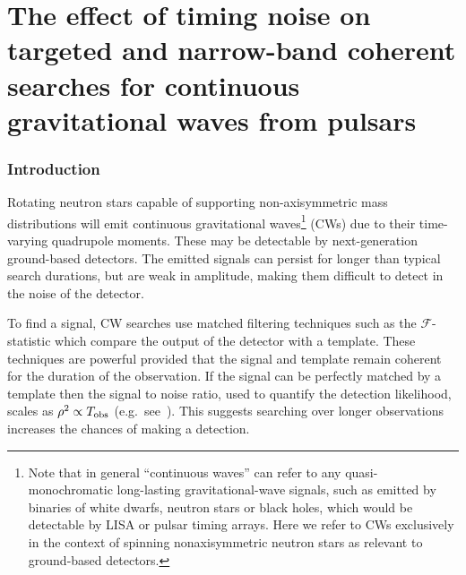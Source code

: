 \documentclass[../full_thesis/full_thesis.tex]{subfiles}
\begin{document}
%

\section{The effect of timing noise on targeted and
    narrow-band coherent searches for continuous gravitational waves
    from pulsars}

\subsubsection{Introduction}
\label{sec: narrow-band introduction} 
Rotating neutron stars capable of supporting non-axisymmetric mass
distributions will emit continuous gravitational
waves\footnote{Note that in general ``continuous waves'' can
    refer to any quasi-monochromatic long-lasting gravitational-wave
        signals, such as emitted by binaries of white dwarfs, neutron
        stars or black holes, which would be detectable by LISA or pulsar
        timing arrays. Here we refer to CWs exclusively in the context of
        spinning nonaxisymmetric neutron stars as relevant to ground-based
        detectors.}
(CWs) due to their
time-varying quadrupole moments. These may be detectable by next-generation ground-based detectors. The emitted
signals can persist for longer than
typical search durations, but are weak in amplitude, making them difficult to detect
in the noise of the detector.

To find a signal, CW searches use matched
filtering techniques such as the $\mathcal{F}$-statistic \citep{Jaranowski1998}
which compare the output of the detector with a template.  These techniques are
powerful provided that the signal and template remain coherent for the duration
of the observation. If the signal can be perfectly matched by a template then
the signal to noise ratio, used to quantify the detection likelihood, scales as
$\rho^{2} \propto T_{\textrm{obs}}$ (e.g.\ see~\citep{Prix2009}). This suggests searching
over longer observations increases the chances of making a detection.
\end{document}
